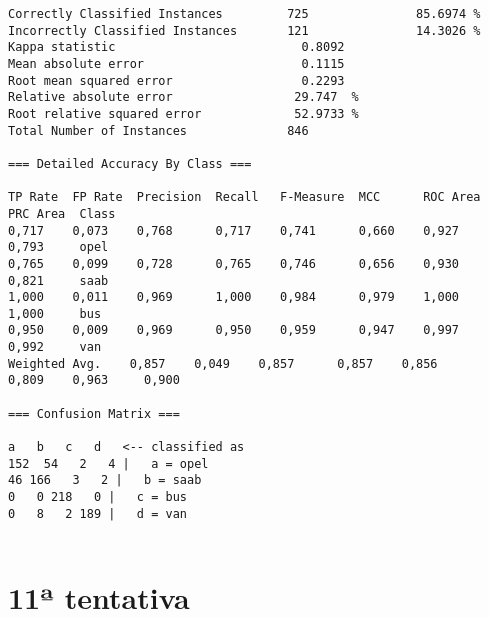 \documentclass[
	article,			%
	11pt,				%
	oneside,			%
	a4paper,			%
	english,			%
	brazil,				%
	sumario=tradicional
	]{abntex2}
\begin{document}
\begin{lstlisting}
Correctly Classified Instances         725               85.6974 %
Incorrectly Classified Instances       121               14.3026 %
Kappa statistic                          0.8092
Mean absolute error                      0.1115
Root mean squared error                  0.2293
Relative absolute error                 29.747  %
Root relative squared error             52.9733 %
Total Number of Instances              846     

=== Detailed Accuracy By Class ===

TP Rate  FP Rate  Precision  Recall   F-Measure  MCC      ROC Area  PRC Area  Class
0,717    0,073    0,768      0,717    0,741      0,660    0,927     0,793     opel
0,765    0,099    0,728      0,765    0,746      0,656    0,930     0,821     saab
1,000    0,011    0,969      1,000    0,984      0,979    1,000     1,000     bus
0,950    0,009    0,969      0,950    0,959      0,947    0,997     0,992     van
Weighted Avg.    0,857    0,049    0,857      0,857    0,856      0,809    0,963     0,900     

=== Confusion Matrix ===

a   b   c   d   <-- classified as
152  54   2   4 |   a = opel
46 166   3   2 |   b = saab
0   0 218   0 |   c = bus
0   8   2 189 |   d = van


\end{lstlisting}

\section{11ª tentativa}
\end{document}
